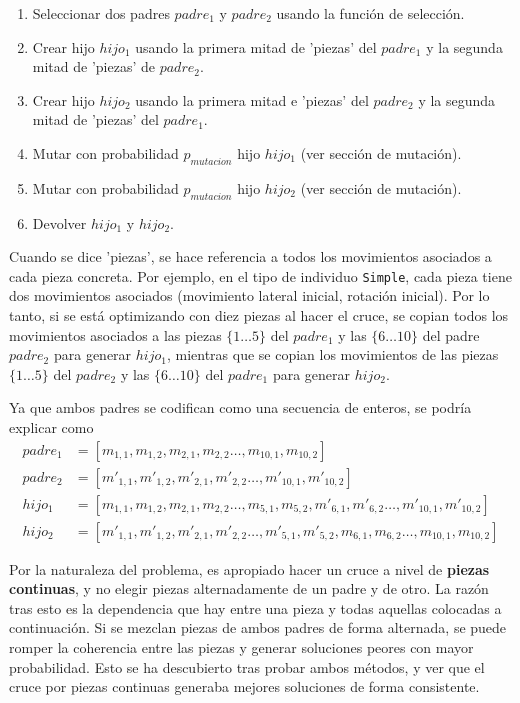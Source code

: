\documentclass[11pt,spanish,listoffigures,listoftables]{tfgetsinf}
\begin{document}
\begin{enumerate}
    \item Seleccionar dos padres $padre_1$ y $padre_2$ usando la función de selección.
    \item Crear hijo $hijo_1$ usando la primera mitad de 'piezas' del $padre_1$ y la segunda mitad de 'piezas' de $padre_2$.
    \item Crear hijo $hijo_2$ usando la primera mitad e 'piezas' del $padre_2$ y la segunda mitad de 'piezas' del $padre_1$.
    \item Mutar con probabilidad $p_{mutacion}$ hijo $hijo_1$ (ver sección de mutación).
    \item Mutar con probabilidad $p_{mutacion}$ hijo $hijo_2$ (ver sección de mutación).
    \item Devolver $hijo_1$ y $hijo_2$.
\end{enumerate}

Cuando se dice 'piezas', se hace referencia a todos los movimientos asociados a cada pieza concreta. Por ejemplo, en el tipo de individuo \texttt{Simple}, cada pieza tiene dos movimientos asociados (movimiento lateral inicial, rotación inicial). Por lo tanto, si se está optimizando con diez piezas al hacer el cruce, se copian todos los movimientos asociados a las piezas $\{1\dots5\}$ del $padre_1$ y las $\{6\dots10\}$ del padre $padre_2$ para generar $hijo_1$, mientras que se copian los movimientos de las piezas $\{1\dots5\}$ del $padre_2$ y las $\{6\dots10\}$ del $padre_1$ para generar $hijo_2$.

Ya que ambos padres se codifican como una secuencia de enteros, se podría explicar como
\begin{align*}
padre_1 &= [m_{1,1}, m_{1,2},  m_{2,1}, m_{2,2} \dots, m_{10,1}, m_{10,2}] \\
padre_2 &= [m'_{1,1}, m'_{1,2},  m'_{2,1}, m'_{2,2} \dots, m'_{10,1}, m'_{10,2}] \\
hijo_1 &= [m_{1,1}, m_{1,2},  m_{2,1}, m_{2,2} \dots, m_{5,1}, m_{5,2}, m'_{6,1}, m'_{6,2} \dots, m'_{10,1}, m'_{10,2}] \\
hijo_2 &= [m'_{1,1}, m'_{1,2},  m'_{2,1}, m'_{2,2} \dots, m'_{5,1}, m'_{5,2}, m_{6,1}, m_{6,2} \dots, m_{10,1}, m_{10,2}]
\end{align*}

Por la naturaleza del problema, es apropiado hacer un cruce a nivel de \textbf{piezas continuas}, y no elegir piezas alternadamente de un padre y de otro. La razón tras esto es la dependencia que hay entre una pieza y todas aquellas colocadas a continuación. Si se mezclan piezas de ambos padres de forma alternada, se puede romper la coherencia entre las piezas y generar soluciones peores con mayor probabilidad. Esto se ha descubierto tras probar ambos métodos, y ver que el cruce por piezas continuas generaba mejores soluciones de forma consistente.
\end{document}
